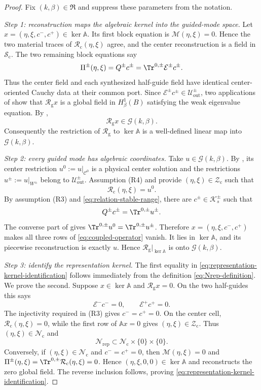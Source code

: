 \begin{proof}
Fix $(k,\beta)\in\mathfrak R$ and suppress these parameters from the
notation.

\emph{Step 1: reconstruction maps the algebraic kernel into the guided-mode
space.}
Let $x=(\eta,\xi,c^-,c^+)\in\ker\mathbb A$.  Its first block equation is
$\mathcal M(\eta,\xi)=0$.  Hence the two material traces of
$\mathcal R_{\mathrm c}(\eta,\xi)$ agree, and the center reconstruction is a
field in $\mathcal S_{\mathrm c}$.  The two remaining block equations say
\[
  \Pi^\pm(\eta,\xi)=Q^\pm c^\pm
  =\Tr^{0,\pm}\mathcal E^\pm c^\pm.
\]
Thus the center field and each synthesized half-guide field have identical
center-oriented Cauchy data at their common port.  Since
$\mathcal E^\pm c^\pm\in\mathcal U^\pm_{\mathrm{out}}$, two applications of
 show that $\mathcal R_{\mathrm g}x$ is a global field
in $H^1_\beta(B)$ satisfying the weak eigenvalue equation.  By
,
\[
  \mathcal R_{\mathrm g}x\in\mathcal G(k,\beta).
\]
Consequently the restriction of $\mathcal R_{\mathrm g}$ to
$\ker\mathbb A$ is a well-defined linear map into $\mathcal G(k,\beta)$.

\emph{Step 2: every guided mode has algebraic coordinates.}
Take $u\in\mathcal G(k,\beta)$.  By
, its center restriction
$u^0:=u|_{\mathcal C^0}$ is a physical center solution and the restrictions
$u^\pm:=u|_{W^\pm}$ belong to
$\mathcal U^\pm_{\mathrm{out}}$.  Assumption (R4) and
 provide
$(\eta,\xi)\in\mathcal Z_{\mathrm c}$ such that
\[
  \mathcal R_{\mathrm c}(\eta,\xi)=u^0.
\]
By assumption (R3) and \eqref{eq:relation-stable-range}, there are
$c^\pm\in\mathcal K_s^\pm$ such that
\[
  Q^\pm c^\pm=\Tr^{0,\pm}u^\pm.
\]
The converse part of  gives
$\Tr^{0,\pm}u^0=\Tr^{0,\pm}u^\pm$.  Therefore
$x=(\eta,\xi,c^-,c^+)$ makes all three rows of
\eqref{eq:coupled-operator} vanish.  It lies in $\ker\mathbb A$, and its
piecewise reconstruction is exactly $u$.  Hence
$\mathcal R_{\mathrm g}|_{\ker\mathbb A}$ is onto
$\mathcal G(k,\beta)$.

\emph{Step 3: identify the representation kernel.}
The first equality in \eqref{eq:representation-kernel-identification} follows
immediately from the definition \eqref{eq:Nrep-definition}.  We prove the
second.  Suppose $x\in\ker\mathbb A$ and
$\mathcal R_{\mathrm g}x=0$.  On the two half-guides this says
\[
  \mathcal E^-c^-=0,
  \qquad
  \mathcal E^+c^+=0.
\]
The injectivity required in (R3) gives $c^-=c^+=0$.  On the center cell,
$\mathcal R_{\mathrm c}(\eta,\xi)=0$, while the first row of
$\mathbb A x=0$ gives $(\eta,\xi)\in\mathcal Z_{\mathrm c}$.  Thus
$(\eta,\xi)\in\mathcal N_{\mathrm c}$ and
\[
  \mathcal N_{\mathrm{rep}}
  \subset\mathcal N_{\mathrm c}\times\{0\}\times\{0\}.
\]
Conversely, if $(\eta,\xi)\in\mathcal N_{\mathrm c}$ and $c^-=c^+=0$,
then $\mathcal M(\eta,\xi)=0$ and
$\Pi^\pm(\eta,\xi)=\Tr^{0,\pm}\mathcal R_{\mathrm c}(\eta,\xi)=0$.
Hence $(\eta,\xi,0,0)\in\ker\mathbb A$ and reconstructs the zero global
field.  The reverse inclusion follows, proving
\eqref{eq:representation-kernel-identification}.


\end{proof}
